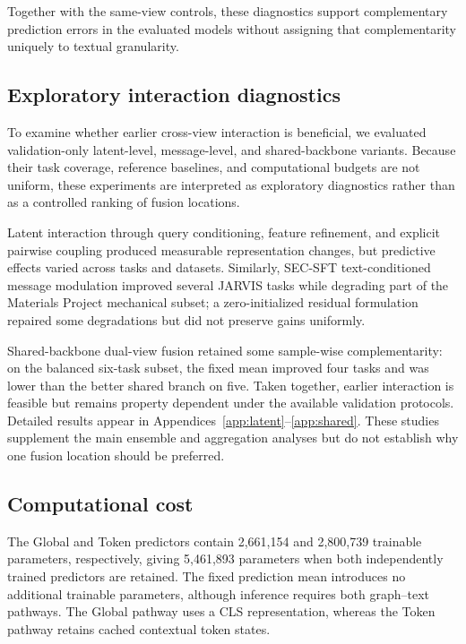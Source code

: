 \documentclass[a4paper,fleqn]{cas-sc}
\begin{document}
Together with the same-view controls, these diagnostics support complementary prediction errors in the evaluated models without assigning that complementarity uniquely to textual granularity.

\FloatBarrier
\subsection{Exploratory interaction diagnostics}\label{sec:interaction}
To examine whether earlier cross-view interaction is beneficial, we evaluated validation-only latent-level, message-level, and shared-backbone variants. Because their task coverage, reference baselines, and computational budgets are not uniform, these experiments are interpreted as exploratory diagnostics rather than as a controlled ranking of fusion locations.

Latent interaction through query conditioning, feature refinement, and explicit pairwise coupling produced measurable representation changes, but predictive effects varied across tasks and datasets. Similarly, SEC-SFT text-conditioned message modulation improved several JARVIS tasks while degrading part of the Materials Project mechanical subset; a zero-initialized residual formulation repaired some degradations but did not preserve gains uniformly.

Shared-backbone dual-view fusion retained some sample-wise complementarity: on the balanced six-task subset, the fixed mean improved four tasks and was lower than the better shared branch on five. Taken together, earlier interaction is feasible but remains property dependent under the available validation protocols. Detailed results appear in Appendices~\ref{app:latent}--\ref{app:shared}. These studies supplement the main ensemble and aggregation analyses but do not establish why one fusion location should be preferred.


\subsection{Computational cost}
The Global and Token predictors contain 2,661,154 and 2,800,739 trainable parameters, respectively, giving 5,461,893 parameters when both independently trained predictors are retained. The fixed prediction mean introduces no additional trainable parameters, although inference requires both graph--text pathways. The Global pathway uses a CLS representation, whereas the Token pathway retains cached contextual token states.
\end{document}
